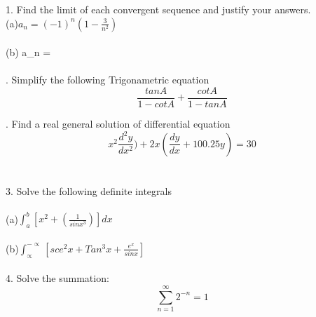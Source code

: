 \documentclass{article}
\begin{document}
1. Find the limit of each convergent sequence and justify your answers.\\
(a)$ a_n = (-1)^n (1 - \frac{3}{n^2}) $\\\\
(b) a_n = \\\\

. Simplify the following Trigonametric equation 
$$ \frac{tanA}{1-cotA} + \frac{cotA}{1-tanA}$$

 . Find a real general solution of differential equation\\
$$x^2 \frac{d^2y}{dx^2}) + 2x(\frac{dy}{dx} + 100.25y) = 30$$\\\\

3. Solve the following definite integrals \\\\
\indent (a)$ \int_{a}^{b} [x^2+(\frac{1}{sinx^3})]dx $  \\\\
\indent (b)$ \int_{\propto}^{- \propto} [sce^2 x + Tan^3 x + \frac{e^x}{sinx} ]$ \\\\

4. Solve the summation:\\
\[ \sum_{n=1}^{\infty} 2^{-n} = 1 \]
\end{document}
